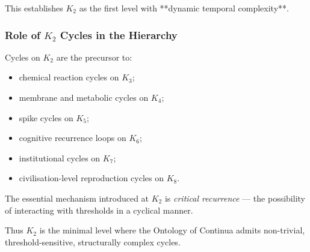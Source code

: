 This establishes $K_2$ as the first level with **dynamic temporal
complexity**.

\subsubsection{Role of \texorpdfstring{$K_2$}{K_2} Cycles in the Hierarchy}

Cycles on $K_2$ are the precursor to:

\begin{itemize}
  \item chemical reaction cycles on $K_3$;
  \item membrane and metabolic cycles on $K_4$;
  \item spike cycles on $K_5$;
  \item cognitive recurrence loops on $K_6$;
  \item institutional cycles on $K_7$;
  \item civilisation-level reproduction cycles on $K_8$.
\end{itemize}

The essential mechanism introduced at $K_2$ is \emph{critical recurrence}
— the possibility of interacting with thresholds in a cyclical manner.

Thus $K_2$ is the minimal level where the Ontology of Continua admits
non-trivial, threshold-sensitive, structurally complex cycles.

